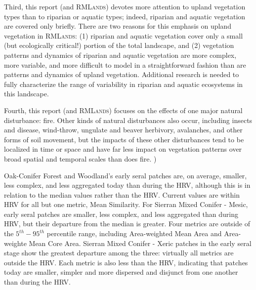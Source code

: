 Third, this report (and \textsc{RMLands}) devotes more attention to upland vegetation types than to riparian or aquatic types; indeed, riparian and aquatic vegetation are covered only briefly. There are two reasons for this emphasis on upland vegetation in \textsc{RMLands}: (1) riparian and aquatic vegetation cover only a small (but ecologically critical!) portion of the total landscape, and (2) vegetation patterns and dynamics of riparian and aquatic vegetation are more complex, more variable, and more difficult to model in a straightforward fashion than are patterns and dynamics of upland vegetation. Additional research is needed to fully characterize the range of variability in riparian and aquatic ecosystems in this landscape. 

Fourth, this report (and \textsc{RMLands}) focuses on the effects of one major natural disturbance: fire. Other kinds of natural disturbances also occur, including insects and disease, wind-throw, ungulate and beaver herbivory, avalanches, and other forms of soil movement, but the impacts of these other disturbances tend to be localized in time or space and have far less impact on vegetation patterns over broad spatial and temporal scales than does fire. )

 Oak-Conifer Forest and Woodland's early seral patches are, on average, smaller, less complex, and less aggregated today than during the HRV, although this is in relation to the median values rather than the HRV. Current values are within HRV for all but one metric, Mean Similarity. For Sierran Mixed Conifer - Mesic, early seral patches are smaller, less complex, and less aggregated than during HRV, but their departure from the median is greater. Four metrics are outside of the $5^{th}-95^{th}$ percentile range, including Area-weighted Mean Area and Area-weighte Mean Core Area. Sierran Mixed Conifer - Xeric patches in the early seral stage show the greatest departure among the three: virtually all metrics are outside the HRV. Each metric is also less than the HRV, indicating that patches today are smaller, simpler and more dispersed and disjunct from one another than during the HRV.

